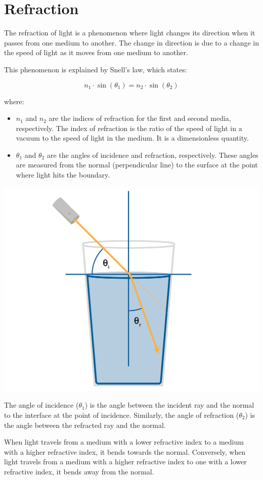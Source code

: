 \chapter{Refraction}


The refraction of light is a phenomenon where light changes its direction when it passes from one medium to another. The change in direction is due to a change in the speed of light as it moves from one medium to another. 

This phenomenon is explained by Snell's law, which states:

\begin{equation}
n_1 \cdot \sin(\theta_1) = n_2 \cdot \sin(\theta_2)
\end{equation}

where:
\begin{itemize}
\item $n_1$ and $n_2$ are the indices of refraction for the first and second media, respectively. The index of refraction is the ratio of the speed of light in a vacuum to the speed of light in the medium. It is a dimensionless quantity.
\item $\theta_1$ and $\theta_2$ are the angles of incidence and refraction, respectively. These angles are measured from the normal (perpendicular line) to the surface at the point where light hits the boundary.
\end{itemize}

\includegraphics[width=.75\textwidth]{refraction.png}

The angle of incidence ($\theta_1$) is the angle between the incident ray and the normal to the interface at the point of incidence. Similarly, the angle of refraction ($\theta_2$) is the angle between the refracted ray and the normal.

When light travels from a medium with a lower refractive index to a medium with a higher refractive index, it bends towards the normal. Conversely, when light travels from a medium with a higher refractive index to one with a lower refractive index, it bends away from the normal.

